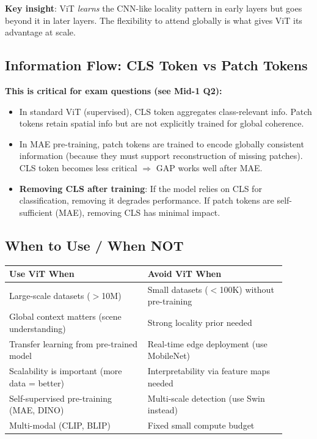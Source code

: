 \textbf{Key insight}: ViT \emph{learns} the CNN-like locality pattern in early layers but goes beyond it in later layers. The flexibility to attend globally is what gives ViT its advantage at scale.

\subsection{Information Flow: CLS Token vs Patch Tokens}

\textbf{This is critical for exam questions (see Mid-1 Q2):}
\begin{itemize}
\item In standard ViT (supervised), CLS token aggregates class-relevant info. Patch tokens retain spatial info but are not explicitly trained for global coherence.
\item In MAE pre-training, patch tokens are trained to encode globally consistent information (because they must support reconstruction of missing patches). CLS token becomes less critical $\Rightarrow$ GAP works well after MAE.
\item \textbf{Removing CLS after training}: If the model relies on CLS for classification, removing it degrades performance. If patch tokens are self-sufficient (MAE), removing CLS has minimal impact.
\end{itemize}

\subsection{When to Use / When NOT}

\begin{center}\small
\begin{tabular}{p{0.45\linewidth}p{0.45\linewidth}}\toprule
\textbf{Use ViT When} & \textbf{Avoid ViT When} \\\midrule
Large-scale datasets ($>$10M) & Small datasets ($<$100K) without pre-training \\
Global context matters (scene understanding) & Strong locality prior needed \\
Transfer learning from pre-trained model & Real-time edge deployment (use MobileNet) \\
Scalability is important (more data = better) & Interpretability via feature maps needed \\
Self-supervised pre-training (MAE, DINO) & Multi-scale detection (use Swin instead) \\
Multi-modal (CLIP, BLIP) & Fixed small compute budget \\
\bottomrule
\end{tabular}
\end{center}

